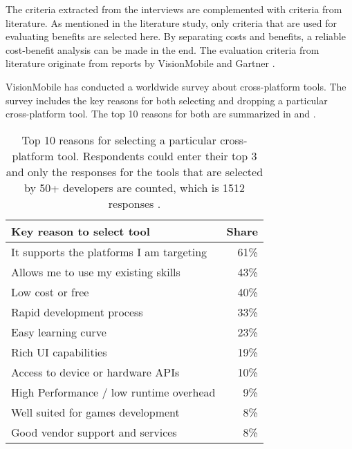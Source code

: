 The criteria extracted from the interviews are complemented with criteria from literature. As mentioned in the literature study, only criteria that are used for evaluating benefits are selected here. By separating costs and benefits, a reliable cost-benefit analysis can be made in the end. The evaluation criteria from literature originate from reports by VisionMobile \cite{VMCPT:2012} and Gartner \cite{Gartner:CPT:2011}.

VisionMobile has conducted a worldwide survey about cross-platform tools. The survey includes the key reasons for both selecting and dropping a particular cross-platform tool. The top 10 reasons for both are summarized in  and .

\begin{table}[h]
    \begin{center}
        \begin{tabular}{lr}
            \hline
            Key reason to select tool                & Share \\
            \hline
            It supports the platforms I am targeting & 61\%  \\
            Allows me to use my existing skills      & 43\%  \\
            Low cost or free                         & 40\%  \\
            Rapid development process                & 33\%  \\
            Easy learning curve                      & 23\%  \\
            Rich UI capabilities                     & 19\%  \\
            Access to device or hardware APIs        & 10\%  \\
            High Performance / low runtime overhead  & 9\%   \\
            Well suited for games development        & 8\%   \\
            Good vendor support and services         & 8\%   \\
            \hline
        \end{tabular}
        \caption{Top 10 reasons for selecting a particular cross-platform tool. Respondents could enter their top 3 and only the responses for the tools that are selected by 50+ developers are counted, which is 1512 responses \cite{VMCPT:2012}.}
        \label{tab:select}
    \end{center}
\end{table}

